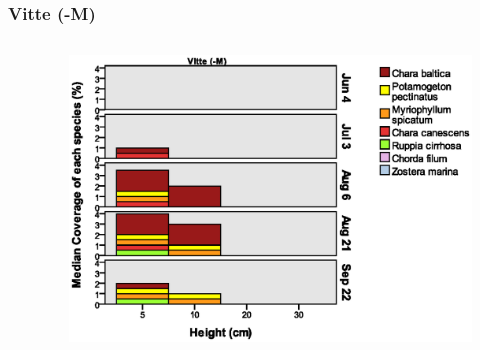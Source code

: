 \documentclass{beamer}
\begin{document}
\begin{frame}
\frametitle{Vitte (-M)}
\begin{columns}
\begin{column}{4.8cm}

\end{column}
\begin{column}{8.0cm}
\begin{figure}
\includegraphics[width=\textwidth]{images/Wuchshoehenkartierung/Vitte-M1.eps}
\end{figure}
\end{column}
\end{columns}
\end{frame}
\end{document}
